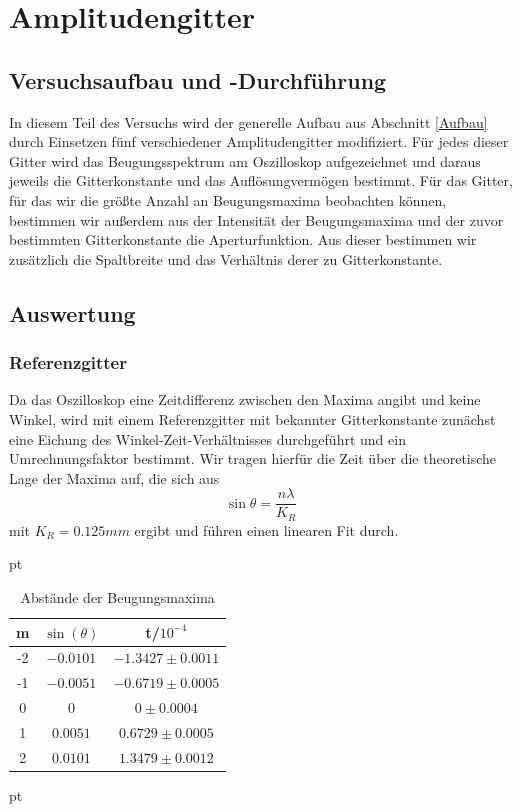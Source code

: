 \documentclass[12pt]{article}
\begin{document}
\newpage
\section{Amplitudengitter}


\subsection{Versuchsaufbau und -Durchführung}

In diesem Teil des Versuchs wird der generelle Aufbau aus Abschnitt \ref{Aufbau} durch Einsetzen fünf verschiedener Amplitudengitter modifiziert. Für jedes dieser Gitter wird das Beugungsspektrum am Oszilloskop aufgezeichnet und daraus jeweils die Gitterkonstante und das Auflösungvermögen bestimmt. Für das Gitter, für das wir die größte Anzahl an Beugungsmaxima beobachten können, bestimmen wir außerdem aus der Intensität der Beugungsmaxima und der zuvor bestimmten Gitterkonstante  die Aperturfunktion. Aus dieser bestimmen wir zusätzlich die Spaltbreite und das Verhältnis derer zu Gitterkonstante.


\subsection{Auswertung}

\subsubsection{Referenzgitter}

\label{Happyisttoll}

Da das Oszilloskop eine Zeitdifferenz zwischen den Maxima angibt und keine Winkel, wird mit einem Referenzgitter mit bekannter Gitterkonstante zunächst eine Eichung des Winkel-Zeit-Verhältnisses durchgeführt und ein Umrechnungsfaktor bestimmt. Wir tragen hierfür die Zeit über die theoretische Lage der Maxima auf, die sich aus \[\sin\theta=\frac{n\lambda}{K_R}\] mit $K_R = 0.125 mm$ ergibt und führen einen linearen Fit durch.

 pt
 \begin{table}[h!]
 {\centering{}
\begin{tabular}{c||c|c}
 m & $\sin(\theta)$ & t/$10^{-4}$ \\ \hline\hline
 -2 &$-0.0101$&    $ -1.3427 \pm 0.0011 $  \\ \hline
 -1 &$-0.0051$& $ -0.6719 \pm 0.0005 $     \\ \hline
 0 &$0$&  $ 0\pm 0.0004$         \\ \hline
 1 &$0.0051$&   $ 0.6729 \pm 0.0005 $        \\ \hline
 2 &$0.0101$&     $ 1.3479 \pm 0.0012 $        \\ \hline

 \end{tabular}
 
 \caption{Abstände der Beugungsmaxima}}
\end{table}
 pt
\end{document}
